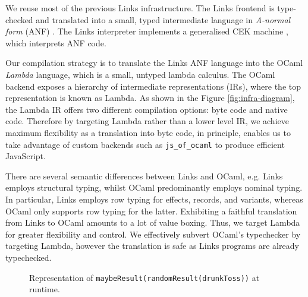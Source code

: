 \documentclass[mscres,cdtppar,twoside,openright,logo,rightchapter,normalheadings]{infthesis}
\theoremstyle{definition}
\begin{document}
We reuse most of the previous Links infrastructure. The Links frontend
is type-checked and translated into a small, typed intermediate
language in \emph{A-normal form} (ANF) \citep{Flanagan1993}. The Links
interpreter implements a generalised CEK machine
\citep{Hillerstrom2016a}, which interprets ANF code.

%

Our compilation strategy is to translate the Links ANF language into the OCaml
\emph{Lambda} language, which is a small, untyped lambda calculus. The OCaml
backend exposes a hierarchy of intermediate representations (IRs), where the
top representation is known as Lambda. As shown in the Figure
\ref{fig:infra-diagram}, the Lambda IR offers two different compilation
options: byte code and native code. Therefore by targeting Lambda rather than
a lower level IR, we achieve maximum flexibility as a translation into byte
code, in principle, enables us to take advantage of custom backends such as
\texttt{js\_of\_ocaml} to produce efficient JavaScript.

%

There are several semantic differences between Links and OCaml, e.g. Links
employs structural typing, whilst OCaml predominantly employs nominal typing.
In particular, Links employs row typing for effects, records, and variants,
whereas OCaml only supports row typing for the latter. Exhibiting a faithful
translation from Links to OCaml amounts to a lot of value boxing. Thus, we
target Lambda for greater flexibility and control.  We effectively subvert
OCaml's typechecker by targeting Lambda, however the translation is safe as
Links programs are already typechecked.

\begin{figure}
\centering
{}
\caption{Representation of \lstinline$maybeResult(randomResult(drunkToss))$ at runtime.}\label{fig:rtstack}
\end{figure}
\end{document}
